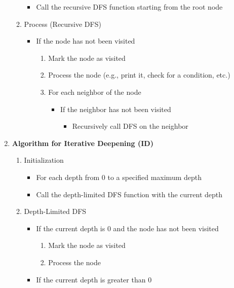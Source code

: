 \documentclass[12pt]{fphw}
\begin{document}
\begin{enumerate}
\begin{enumerate}
\begin{itemize}
          \item Call the recursive DFS function starting from the root node 
        \end{itemize}
      \item Process (Recursive DFS)
        \begin{itemize}
          \item If the node has not been visited
            \begin{enumerate}
              \item Mark the node as visited
              \item Process the node (e.g., print it, check for a condition, etc.)
              \item For each neighbor of the node 
                \begin{itemize}
                  \item If the neighbor has not been visited
                    \begin{itemize}
                      \item Recursively call DFS on the neighbor
                    \end{itemize}
                \end{itemize}
            \end{enumerate}
        \end{itemize}
    \end{enumerate}
  \item \textbf{Algorithm for Iterative Deepening (ID)}
    \begin{enumerate}
      \item Initialization
        \begin{itemize}
          \item For each depth from 0 to a specified maximum depth 
          \item Call the depth-limited DFS function with the current depth
        \end{itemize}
      \item Depth-Limited DFS 
        \begin{itemize}
          \item If the current depth is 0 and the node has not been visited
            \begin{enumerate}
              \item Mark the node as visited
              \item Process the node 
            \end{enumerate}
          \item If the current depth is greater than 0 

\end{itemize}
\end{enumerate}
\end{enumerate}
\end{document}
